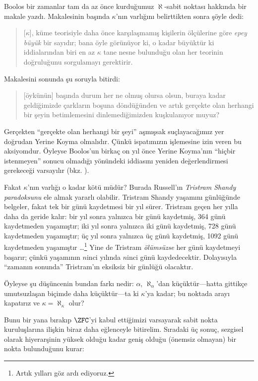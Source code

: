 \documentclass[../../../include/open-logic-section]{subfiles}
\begin{document}
Boolos bir zamanlar tam da az önce kurduğumuz $\aleph$-sabit noktası
hakkında bir makale yazdı. Makalesinin başında $\kappa$'nın varlığını
belirttikten sonra şöyle dedi:
\begin{quote}
	[$\kappa$], küme teorisiyle daha önce karşılaşmamış kişilerin ölçülerine
	göre \emph{epey büyük} bir sayıdır; bana öyle görünüyor ki, o kadar
	büyüktür ki iddialarından biri en az $\kappa$ tane nesne bulunduğu olan
	her teorinin doğruluğunu sorgulamayı gerektirir.
	\citep[p.~257]{Boolos2000}
\end{quote}
Makalesini sonunda şu soruyla bitirdi:
\begin{quote}
	[öykünün] başında durum her ne olmuş olursa olsun, buraya kadar
	geldiğimizde çarkların boşuna döndüğünden ve artık gerçekte olan herhangi
	bir şeyin betimlemesini dinlemediğimizden kuşkulanıyor muyuz?
	\citep[p.~268]{Boolos2000}
\end{quote}
Gerçekten ``gerçekte olan herhangi bir şeyi'' aşmışsak suçlayacağımız yer
doğrudan Yerine Koyma olmalıdır. Çünkü ispatımızın işlemesine izin veren bu
aksiyomdur. Öyleyse Boolos'un birkaç on yıl önce Yerine Koyma'nın ``hiçbir
istenmeyen'' sonucu olmadığı yönündeki iddiasını yeniden değerlendirmesi
gerekeceği varsayılır (bkz. ).

Fakat $\kappa$'nın varlığı o kadar kötü müdür? Burada Russell'ın
\emph{Tristram Shandy paradoksunu} ele almak yararlı olabilir. Tristram
Shandy yaşamını günlüğünde belgeler, fakat tek bir günü kaydetmesi bir yıl
sürer. Tristram geçen her yılla daha da geride kalır: bir yıl sonra yalnızca
bir günü kaydetmiş, 364 günü kaydetmeden yaşamıştır; iki yıl sonra yalnızca
iki günü kaydetmiş, 728 günü kaydetmeden yaşamıştır; üç yıl sonra yalnızca
üç günü kaydetmiş, 1092 günü kaydetmeden yaşamıştır
\dots\footnote{Artık yılları göz ardı ediyoruz.} Yine de Tristram
\emph{ölümsüzse} her günü kaydetmeyi başarır; çünkü yaşamının $n$inci
yılında $n$inci günü kaydedecektir. Dolayısıyla ``zamanın sonunda''
Tristram'ın eksiksiz bir günlüğü olacaktır.

Öyleyse şu düşüncenin bundan farkı nedir: $\alpha$, $\aleph_\alpha$'dan
küçüktür---hatta gittikçe umutsuzlaşan biçimde daha küçüktür---ta ki
$\kappa$'ya kadar; bu noktada arayı kapatırız ve
$\kappa=\aleph_\kappa$ olur?

Bunu bir yana bırakıp $\ZFC$'yi kabul ettiğimizi varsayarak sabit nokta
kuruluşlarına ilişkin biraz daha eğlenceyle bitirelim. Sıradaki üç sonuç,
sezgisel olarak hiyerarşinin yüksek olduğu kadar geniş olduğu (önemsiz
olmayan) bir nokta bulunduğunu kurar:
\end{document}
